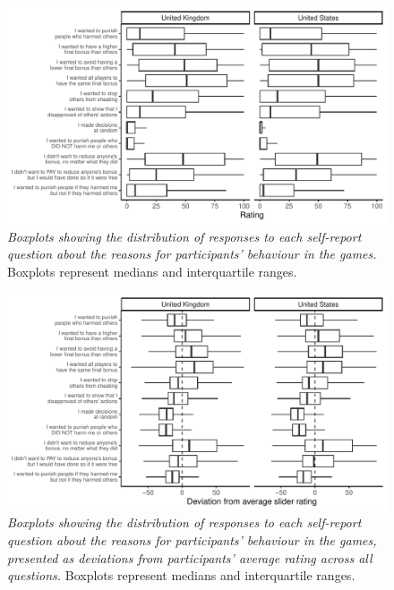 \documentclass[
  man,floatsintext]{apa6}
\begin{document}
\newpage





\begin{figure}
\centering
\includegraphics{manuscript_files/figure-latex/plotSliders1-1.pdf}
\caption{\label{fig:plotSliders1}\emph{Boxplots showing the distribution of responses to each
self-report question about the reasons for participants' behaviour in the games.}
Boxplots represent medians and interquartile ranges.}
\end{figure}

\newpage






\begin{figure}
\centering
\includegraphics{manuscript_files/figure-latex/plotSliders2-1.pdf}
\caption{\label{fig:plotSliders2}\emph{Boxplots showing the distribution of responses to each
self-report question about the reasons for participants' behaviour in the games,
presented as deviations from participants' average rating across all questions.}
Boxplots represent medians and interquartile ranges.}
\end{figure}
\end{document}
